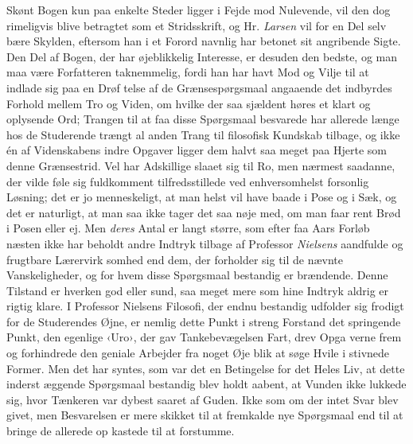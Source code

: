 \documentclass[12pt,a4paper,openany]{book}
\newcommand{\opage}[1]{\marginnote{\footnotesize\textit{[#1]}}}
\begin{document}
Skønt Bogen kun paa enkelte Steder ligger i Fejde mod
Nulevende, vil den dog rimeligvis blive betragtet som et
Stridsskrift, og Hr. \emph{Larsen} vil for en Del selv bære Skylden,
eftersom han i et Forord navnlig har betonet sit angribende
\opage{8}Sigte. Den Del af Bogen, der har øjeblikkelig Interesse, er
desuden den bedste, og man maa være Forfatteren taknemmelig,
fordi han har havt Mod og Vilje til at indlade sig paa en Drøf\-%
telse af de Grænsespørgsmaal angaaende det indbyrdes Forhold
mellem Tro og Viden, om hvilke der saa sjældent høres et klart
og oplysende Ord; Trangen til at faa disse Spørgsmaal besvarede
har allerede længe hos de Studerende trængt al anden Trang til
filosofisk Kundskab tilbage, og ikke én af Videnskabens indre
Opgaver ligger dem halvt saa meget paa Hjerte som denne
Grænsestrid. Vel har Adskillige slaaet sig til Ro, men nærmest
saadanne, der vilde føle sig fuldkomment tilfredsstillede ved
enhversomhelst forsonlig Løsning; det er jo menneskeligt, at
man helst vil have baade i Pose og i Sæk, og det er naturligt,
at man saa ikke tager det saa nøje med, om man faar rent
Brød i Posen eller ej. Men \emph{deres} Antal er langt større, som
efter faa Aars Forløb næsten ikke har beholdt andre Indtryk
tilbage af Professor \emph{Nielsens} aandfulde og frugtbare Lærervirk\-%
somhed end dem, der forholder sig til de nævnte Vanskeligheder,
og for hvem disse Spørgsmaal bestandig er brændende. Denne
Tilstand er hverken god eller sund, saa meget mere som hine
Indtryk aldrig er rigtig klare. I Professor Nielsens Filosofi, der
endnu bestandig udfolder sig frodigt for de Studerendes Øjne, er
nemlig dette Punkt i streng Forstand det springende Punkt, den
egenlige ‹Uro›, der gav Tankebevægelsen Fart, drev Opga\-%
verne frem og forhindrede den geniale Arbejder fra noget Øje\-%
blik at søge Hvile i stivnede Former. Men det har syntes, som
var det en Betingelse for det Heles Liv, at dette inderst æggende
Spørgsmaal bestandig blev holdt aabent, at Vunden ikke lukkede
sig, hvor Tænkeren var dybest saaret af Guden. Ikke som om
der intet Svar blev givet, men Besvarelsen er mere skikket til
at fremkalde nye Spørgsmaal end til at bringe de allerede op\-%
kastede til at forstumme.
\end{document}
